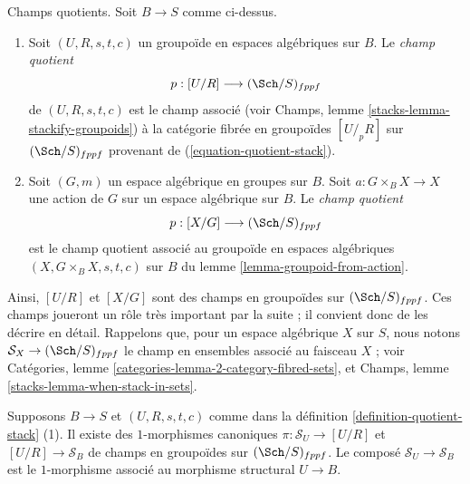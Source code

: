 \begin{definition}
\label{definition-quotient-stack}
Champs quotients. Soit $B \to S$ comme ci-dessus.
\begin{enumerate}
\item Soit $(U, R, s, t, c)$ un groupoïde en espaces algébriques sur $B$. Le {\it champ quotient}
$$
p : [U/R] \longrightarrow (\Sch/S)_{fppf}
$$
de $(U, R, s, t, c)$ est le champ associé (voir Champs, lemme \ref{stacks-lemma-stackify-groupoids}) à la catégorie fibrée en groupoïdes $[U/_{\!p}R]$ sur $(\Sch/S)_{fppf}$ provenant de (\ref{equation-quotient-stack}).
\item Soit $(G, m)$ un espace algébrique en groupes sur $B$. Soit $a : G \times_B X \to X$ une action de $G$ sur un espace algébrique sur $B$. Le {\it champ quotient}
$$
p : [X/G] \longrightarrow (\Sch/S)_{fppf}
$$
est le champ quotient associé au groupoïde en espaces algébriques $(X, G \times_B X, s, t, c)$ sur $B$ du lemme \ref{lemma-groupoid-from-action}.
\end{enumerate}
\end{definition}

\noindent
Ainsi, $[U/R]$ et $[X/G]$ sont des champs en groupoïdes sur $(\Sch/S)_{fppf}$. Ces champs joueront un rôle très important par la suite ; il convient donc de les décrire en détail. Rappelons que, pour un espace algébrique $X$ sur $S$, nous notons $\mathcal{S}_X \to (\Sch/S)_{fppf}$ le champ en ensembles associé au faisceau $X$ ; voir Catégories, lemme \ref{categories-lemma-2-category-fibred-sets}, et Champs, lemme \ref{stacks-lemma-when-stack-in-sets}.

\begin{lemma}
\label{lemma-quotient-stack-arrows}
Supposons $B \to S$ et $(U, R, s, t, c)$ comme dans la définition \ref{definition-quotient-stack} (1). Il existe des $1$-morphismes canoniques $\pi : \mathcal{S}_U \to [U/R]$ et $[U/R] \to \mathcal{S}_B$ de champs en groupoïdes sur $(\Sch/S)_{fppf}$. Le composé $\mathcal{S}_U \to \mathcal{S}_B$ est le $1$-morphisme associé au morphisme structural $U \to B$.
\end{lemma}

